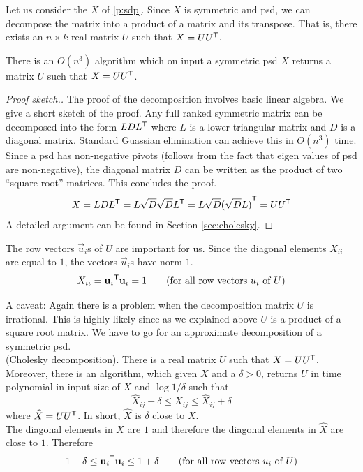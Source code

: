 \documentclass[12pt,
    driverfallback=dvipdfm,
 	openany,
    a4paper,
    toc=bibliography,
    twoside,
    numbers=noenddot]{article}              %
\begin{document}
Let us consider the $X$ of \ref{p:sdp}. Since $X$ is symmetric and psd, we can decompose the matrix into a product of a matrix and its transpose. That is, there exists an $n \times k$ real matrix $U$ such that $X = U {U}^{\mathsf{T}}$. 
\begin{lemma}
\label{lem:cholesky}
There is an $O(n^3)$ algorithm which on input a symmetric psd $X$ returns a matrix $U$ such that $X = U {U}^{\mathsf{T}}$. 
\end{lemma}
\begin{proof}[Proof sketch.]
The proof of the decomposition involves basic linear algebra. We give a short sketch of the proof. Any full ranked symmetric matrix can be decomposed into the form $L D {L}^{\mathsf{T}}$ where $L$ is a lower triangular matrix and $D$ is a diagonal matrix. Standard Guassian elimination can achieve this in $O(n^3)$ time. Since a psd has non-negative pivots (follows from the fact that eigen values of psd are non-negative), the diagonal matrix $D$ can be written as the product of two ``square root'' matrices. This concludes the proof.
\[X = LD {L}^{\mathsf{T}} = L \sqrt D \sqrt D {L}^{\mathsf{T}} = L \sqrt D {(\sqrt D L)}^{\mathsf{T}} = U {U}^{\mathsf{T}} \]
A detailed argument can be found in Section \ref{sec:cholesky}.
\end{proof}
The row vectors $\vec u_i$s of $U$ are important for us. Since the diagonal elements $X_{ii}$ are equal to $1$, the vectors $\vec u_i$s have norm $1$.
\[ 
X_{ii} = {\mathbf u_i}^{\mathsf{T}} \mathbf u_i = 1 \tag{for all row vectors $u_i$ of $U$}
\]


\begin{mdframed}[backgroundcolor=light-gray, linecolor=light-gray]
A caveat: Again there is a problem when the decomposition matrix $U$ is irrational. This is highly likely since as we explained above $U$ is a product of a 
square root matrix. We have to go for an approximate decomposition of a symmetric psd. \\

 (Cholesky decomposition). 
There is a real matrix $U$ such that $X = U {U}^{\mathsf{T}}$. Moreover, there is an algorithm, which given $X$ and a $\delta > 0$, returns $U$ in time polynomial in input size of $X$ and $\log 1/\delta$ such that
\[
\widehat X_{ij} -\delta \leq X_{ij} \leq  \widehat X_{ij} + \delta
\]
where $\widehat X = U {U}^{\mathsf{T}}$. In short, $\widehat X$ is $\delta$ close to $X$. \\

\noindent The diagonal elements in $X$ are $1$ and therefore the diagonal elements in $\widehat X$ are close to $1$. Therefore
\[
1 -\delta \leq {\mathbf u_i}^{\mathsf{T}} \mathbf u_i \leq  1 + \delta \tag{for all row vectors $u_i$ of $U$}
\]
\end{mdframed}
\end{document}
